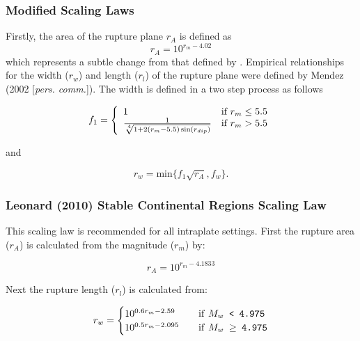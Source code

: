 \subsubsection{Modified \citep{eqrm_Wells94} Scaling Laws}

Firstly, the area of the rupture plane $r_A$ is defined as
\begin{equation}
r_A = 10^{r_m - 4.02}
\end{equation}
which represents a subtle change from that defined by
\citep{eqrm_Wells94}. Empirical relationships for the width ($r_w$)
and length ($r_l$) of the rupture plane were defined by Mendez (2002
[\textit{pers. comm.}]). The width is defined in a two step
process as follows

\begin{equation}
 f_1 = \left \{ \begin{array}{ll}
 1 & \textrm{if $r_m \leq 5.5$} \\
\frac{1}{\sqrt[\leftroot{-2}\uproot{2}4]{1+2(r_m-5.5)\sin(r_{dip})}} & \textrm{if $r_m>5.5$} \\
\end{array} \right.
\end{equation}

and

\begin{equation}
r_w = \textrm{min$\{f_1\sqrt{r_A},f_w\}$}.
\end{equation}

\subsubsection{Leonard (2010) Stable Continental Regions Scaling Law}
This scaling law is recommended for all intraplate settings. First the rupture area ($r_A$) is calculated from the magnitude ($r_m$) by:

\begin{equation}
r_{A} = 10^{r_m-4.1833}
\end{equation}

Next the rupture length ($r_l$) is calculated from:

\begin{equation}\label{leonard_rw}
r_w = 
\begin{cases}
10^{0.6r_m-2.59}	& \quad \mbox{if \texttt{$M_w$ < 4.975}} \\
10^{0.5r_m-2.095}	& \quad \mbox{if \texttt{$M_w$ $\ge$ 4.975}} \\
\end{cases}
\end{equation}

